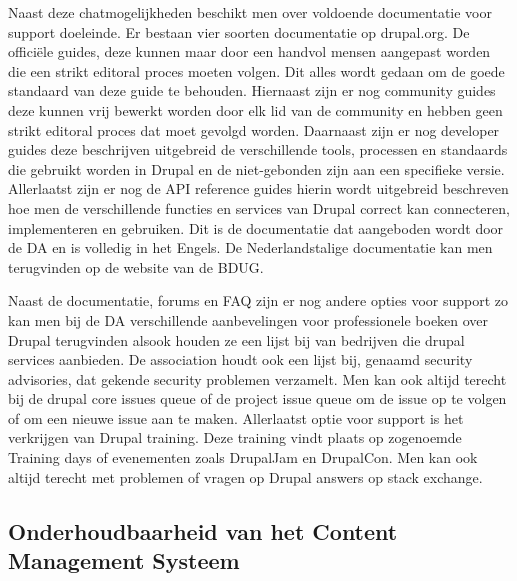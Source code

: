 Naast deze chatmogelijkheden beschikt men over voldoende documentatie voor support doeleinde. Er bestaan vier soorten documentatie op drupal.org. De officiële guides, deze kunnen maar door een handvol mensen aangepast worden die een strikt editoral proces moeten volgen. Dit alles wordt gedaan om de goede standaard van deze guide te behouden. Hiernaast zijn er nog community guides deze kunnen vrij bewerkt worden door elk lid van de community en hebben geen strikt editoral proces dat moet gevolgd worden. Daarnaast zijn er nog developer guides deze beschrijven uitgebreid de verschillende tools, processen en standaards die gebruikt worden in Drupal en de niet-gebonden zijn aan een specifieke versie. Allerlaatst zijn er nog de API reference guides hierin wordt uitgebreid beschreven hoe men de verschillende functies en services van Drupal correct kan connecteren, implementeren en gebruiken. Dit is de documentatie dat aangeboden wordt door de DA en is volledig in het Engels. De Nederlandstalige documentatie kan men terugvinden op de website van de BDUG. 

Naast de documentatie, forums en FAQ zijn er nog andere opties voor support zo kan men bij de DA verschillende aanbevelingen voor professionele boeken over Drupal terugvinden alsook houden ze een lijst bij van bedrijven die drupal services aanbieden. De association houdt ook een lijst bij, genaamd security advisories, dat gekende security problemen verzamelt. Men kan ook altijd terecht bij de drupal core issues queue of de project issue queue om de issue op te volgen of om een nieuwe issue aan te maken. Allerlaatst optie voor support is het verkrijgen van Drupal training. Deze training vindt plaats op zogenoemde Training days of evenementen zoals DrupalJam en DrupalCon. Men kan ook altijd terecht met problemen of vragen op Drupal answers op stack exchange.

\subsection{Onderhoudbaarheid van het Content Management Systeem} 
